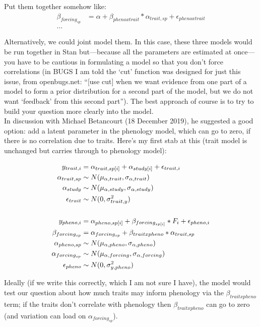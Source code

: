\documentclass[11pt,letter]{article}
\begin{document}
Put them together somehow like:
\begin{align*}
\beta_{forcing_{sp}} &= \alpha + \beta_{pheno x trait}*\alpha_{trait, sp} + \epsilon_{pheno x trait}\\
...
\end{align*}

Alternatively, we could joint model them. In this case, these three models would be run together in Stan but---because all the parameters are estimated at once---you have to be cautious in formulating a model so that you don't force correlations (in BUGS I am told the `cut' function was designed for just this issue, from openbugs.net: ``[use cut] when we want evidence from one part of a model to form a prior distribution for a second part of the model, but we do not want `feedback' from this second part''). The best approach of course is to try to build your question more clearly into the model. \\

In discussion with Michael Betancourt (18 December 2019), he suggested a good option: add a latent parameter in the phenology model, which can go to zero, if there is no correlation due to traits. Here's my first stab at this (trait model is unchanged but carries through to phenology model):

\begin{align*}
y_{trait, i} &= \alpha_{trait, sp[i]} + \alpha_{study[i]} + \epsilon_{trait, i}\\
\alpha_{trait, sp} & \sim N(\mu_{\alpha, trait}, \sigma_{\alpha, trait}) \\
\alpha_{study}  & \sim N(\mu_{\alpha, study}, \sigma_{\alpha, study})\\
\epsilon_{trait} & \sim N(0,\sigma^2_{trait, y}) \\
\vspace{1ex}\\
y_{pheno, i} &= \alpha_{pheno, sp[i]} + \beta_{forcing_{sp[i]}}*F_i + \epsilon_{pheno, i}\\
\beta_{forcing_{sp}} & = \alpha_{forcing_{sp}} + \beta_{trait x pheno}*\alpha_{trait, sp} \\
\alpha_{pheno, sp} & \sim N(\mu_{\alpha, pheno}, \sigma_{\alpha, pheno}) \\
\alpha_{forcing_{sp}} & \sim N(\mu_{\alpha, forcing}, \sigma_{\alpha, forcing})\\
\epsilon_{pheno} & \sim N(0,\sigma^2_{y, pheno}) 
\end{align*}

Ideally (if we write this correctly, which I am not sure I have), the model would test our question about how much traits may inform phenology via the $\beta_{trait x pheno}$ term; if the traits don't correlate with phenology then $\beta_{trait x pheno}$ can go to zero (and variation can load on $\alpha_{forcing_{sp}}$). \\
\end{document}
